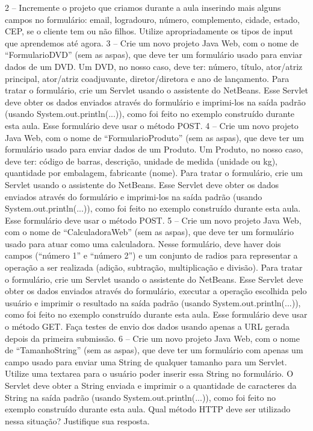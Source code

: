 2 – Incremente o projeto que criamos durante a aula inserindo mais alguns campos no formulário: email, logradouro, número, complemento, cidade, estado, CEP, se o cliente tem ou não filhos. Utilize apropriadamente os tipos de input que aprendemos até agora.
3 – Crie um novo projeto Java Web, com o nome de “FormularioDVD” (sem as aspas), que deve ter um formulário usado para enviar dados de um DVD. Um DVD, no nosso caso, deve ter: número, título, ator/atriz principal, ator/atriz coadjuvante, diretor/diretora e ano de lançamento. Para tratar o formulário, crie um Servlet usando o assistente do NetBeans. Esse Servlet deve obter os dados enviados através do formulário e imprimi-los na saída padrão (usando System.out.println(...)), como foi feito no exemplo construído durante esta aula. Esse formulário deve usar o método POST.
4 – Crie um novo projeto Java Web, com o nome de “FormularioProduto” (sem as aspas), que deve ter um formulário usado para enviar dados de um Produto. Um Produto, no nosso caso, deve ter: código de barras, descrição, unidade de medida (unidade ou kg), quantidade por embalagem, fabricante (nome). Para tratar o formulário, crie um Servlet usando o assistente do NetBeans. Esse Servlet deve obter os dados enviados através do formulário e imprimi-los na saída padrão (usando System.out.println(...)), como foi feito no exemplo construído durante esta aula. Esse formulário deve usar o método POST.
5 – Crie um novo projeto Java Web, com o nome de “CalculadoraWeb” (sem as aspas), que deve ter um formulário usado para atuar como uma calculadora. Nesse formulário, deve haver dois campos (“número 1” e “número 2”) e um conjunto de radios para representar a operação a ser realizada (adição, subtração, multiplicação e divisão). Para tratar o formulário, crie um Servlet usando o assistente do NetBeans. Esse Servlet deve obter os dados enviados através do formulário, executar a operação escolhida pelo usuário e imprimir o resultado na saída padrão (usando System.out.println(...)), como foi feito no exemplo construído durante esta aula. Esse formulário deve usar o método GET. Faça testes de envio dos dados usando apenas a URL gerada depois da primeira submissão.
6 – Crie um novo projeto Java Web, com o nome de “TamanhoString” (sem as aspas), que deve ter um formulário com apenas um campo usado para enviar uma String de qualquer tamanho para um Servlet. Utilize uma textarea para o usuário poder inserir essa String no formulário. O Servlet deve obter a String enviada e imprimir o a quantidade de caracteres da String na saída padrão (usando System.out.println(...)), como foi feito no exemplo construído durante esta aula. Qual método HTTP deve ser utilizado nessa situação? Justifique sua resposta.

